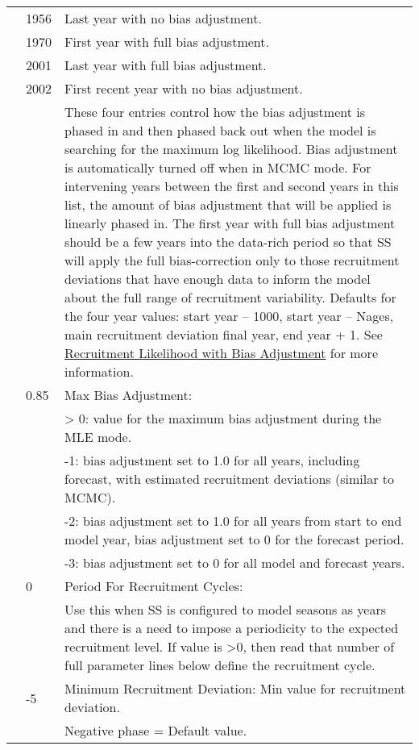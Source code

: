 \begin{longtable}{p{1cm} p{3cm} p{11cm}}
	\Tstrut & 1956 & Last year with no bias adjustment. \\
			& 1970 & First year with full bias adjustment. \\
			& 2001 & Last year with full bias adjustment. \\
			& 2002 & First recent year with no bias adjustment. \\
			&      & These four entries control how the bias adjustment is phased in and then phased back out when the model is searching for the maximum log likelihood.  Bias adjustment is automatically turned off when in MCMC mode.  For intervening years between the first and second years in this list, the amount of bias adjustment that will be applied is linearly phased in.  The first year with full bias adjustment should be a few years into the data-rich period so that SS will apply the full bias-correction only to those recruitment deviations that have enough data to inform the model about the full range of recruitment variability.  Defaults for the four year values: start year – 1000, start year – Nages, main recruitment deviation final year, end year + 1. See \hyperlink{RecBias}{Recruitment Likelihood with Bias Adjustment} for more information.\\
	
	\Tstrut & 0.85 & Max Bias Adjustment: \\
			&      & > 0: value for the maximum bias adjustment during the MLE mode. \\
			& 	   & -1: bias adjustment set to 1.0 for all years, including forecast, with estimated recruitment deviations (similar to MCMC).\\
			& 	   & -2: bias adjustment set to 1.0 for all years from start to end model year, bias adjustment set to 0 for the forecast period. \\
			& 	   & -3: bias adjustment set to 0 for all model and forecast years.\\

	\Tstrut & 0    & Period For Recruitment Cycles: \\
			&      & Use this when SS is configured to model seasons as years and there is a need to impose a periodicity to the expected recruitment level.  If value is >0, then read that number of full parameter lines below define the recruitment cycle. \\
	
	\Tstrut & -5   & Minimum Recruitment Deviation: Min value for recruitment deviation.\\
			&      & Negative phase = Default value.\\


\end{longtable}
